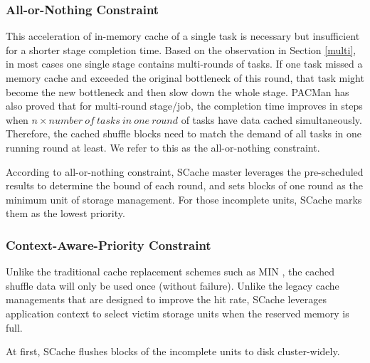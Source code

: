 \subsubsection{All-or-Nothing Constraint}
This acceleration of in-memory cache of a single task is necessary but insufficient for a shorter stage completion time. 
Based on the observation in Section \ref{multi}, in most cases one single stage contains multi-rounds of tasks. 
If one task missed a memory cache and exceeded the original bottleneck of this round, that task might become the new bottleneck and then slow down the whole stage. 
PACMan \cite{pacman} has also proved that for multi-round stage/job, the completion time improves in steps when $n\times number\ of\ tasks\ in\ one\ round$ of tasks have data cached simultaneously. 
Therefore, the cached shuffle blocks need to match the demand of all tasks in one running round at least. We refer to this as the all-or-nothing constraint.

According to all-or-nothing constraint, SCache master leverages the pre-scheduled results to determine the bound of each round, and sets blocks of one round as the minimum unit of storage management.
For those incomplete units, SCache marks them as the lowest priority.

\subsubsection{Context-Aware-Priority Constraint}
Unlike the traditional cache replacement schemes such as MIN \cite{min}, the cached shuffle data will only be used once (without failure). 
Unlike the legacy cache managements that are designed to improve the hit rate, 
SCache leverages application context to select victim storage units when the reserved memory is full.

At first, SCache flushes blocks of the incomplete units to disk cluster-widely.

